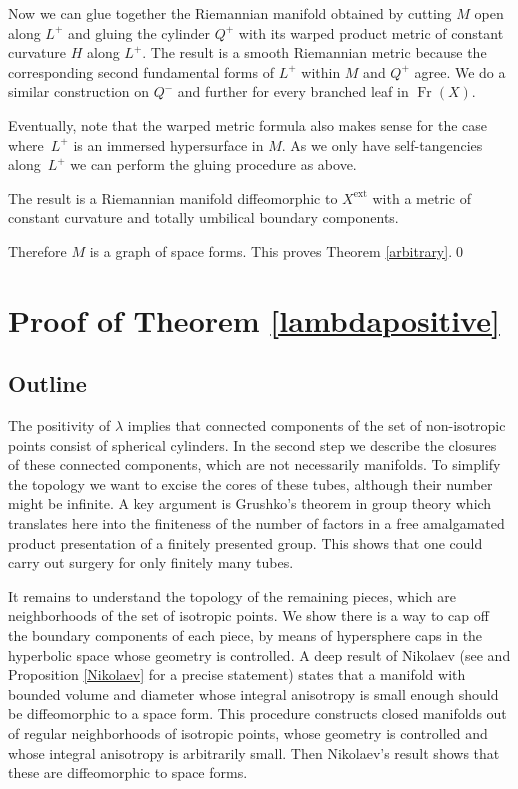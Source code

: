 \documentclass[JEP,XML,SOM,Unicode]{cedram}
\DeclareMathOperator{\Fr}{Fr}
\theoremstyle{definition}
\theoremstyle{remark}
\numberwithin{equation}{section}
\begin{document}
Now we can glue together the Riemannian manifold obtained by cutting $M$ open along $L^{+}$ and gluing
the cylinder $Q^{+}$ with its warped product metric of constant curvature $H$ along $L^{+}$.
The result is a smooth Riemannian metric because the corresponding second fundamental forms of $L^+$ within
$M$ and $Q^+$ agree. We do a similar construction on $Q^-$ and further for every branched leaf in $\Fr(X)$.

Eventually, note that the warped metric formula also makes sense for the case where~$L^{+}$ is an immersed hypersurface in $M$. As we only have self-tangencies along~$L^+$
we can perform the gluing procedure as above.

The result is a Riemannian manifold diffeomorphic to $X^\mathrm{ext}$ with a metric of
constant curvature and totally umbilical
boundary components.

Therefore $M$ is a graph of space forms.
This proves Theorem \ref{arbitrary}.\qed

\section{Proof of Theorem \ref{lambdapositive}}\label{sec:4}
\subsection{Outline}
The positivity of $\lambda$ implies that connected components of the set of
non-isotropic points consist of spherical cylinders.
In the second step we describe the closures of these connected components, which are not necessarily manifolds.
To simplify the topology we want to excise the cores of these tubes, although their number might be infinite.
A key argument is Grushko's theorem in group theory which translates here into the finiteness of the number
of factors in a free amalgamated product presentation of
a finitely presented group. This shows that one could carry out
surgery for only finitely many tubes.

It remains to understand the topology of the remaining pieces, which are
neighborhoods of the set of isotropic points.
We show there is a way to cap off the boundary components of each piece,
by means of hypersphere
caps in the hyperbolic space whose geometry is controlled.
A deep result of Nikolaev (see \cite{Nik} and Proposition \ref{Nikolaev} for a precise statement) states that
a manifold with bounded volume and diameter whose integral
anisotropy is small enough should be diffeomorphic to a space form.
This procedure constructs closed manifolds out of regular neighborhoods
of isotropic points, whose geometry is controlled and whose
integral anisotropy is arbitrarily small. Then Nikolaev's result
shows that these are diffeomorphic to space forms.
\end{document}
